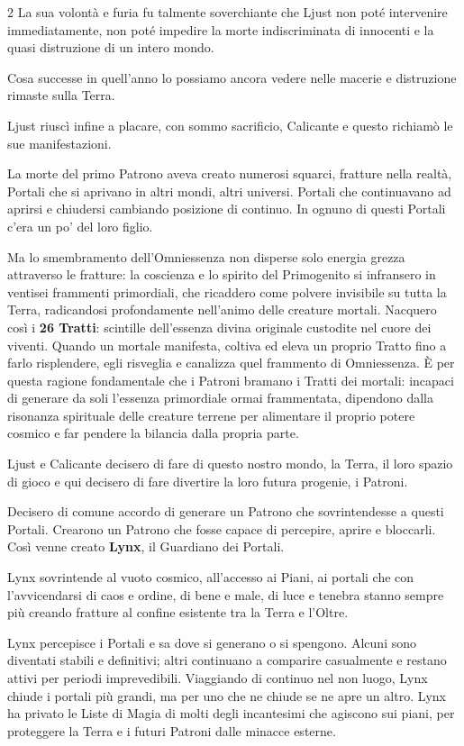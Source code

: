 \begin{multicols}{2}
La sua volontà e furia fu talmente soverchiante che Ljust non poté intervenire immediatamente, non poté impedire la morte indiscriminata di innocenti e la quasi distruzione di un intero mondo.

Cosa successe in quell'anno lo possiamo ancora vedere nelle macerie e distruzione rimaste sulla Terra.

Ljust riuscì infine a placare, con sommo sacrificio, Calicante e questo richiamò le sue manifestazioni.

La morte del primo Patrono aveva creato numerosi squarci, fratture nella realtà, Portali che si aprivano in altri mondi, altri universi. Portali che continuavano ad aprirsi e chiudersi cambiando posizione di continuo. In ognuno di questi Portali c'era un po' del loro figlio.

Ma lo smembramento dell'Omniessenza non disperse solo energia grezza attraverso le fratture: la coscienza e lo spirito del Primogenito si infransero in ventisei frammenti primordiali, che ricaddero come polvere invisibile su tutta la Terra, radicandosi profondamente nell'animo delle creature mortali. Nacquero così i \textbf{26 Tratti}: scintille dell'essenza divina originale custodite nel cuore dei viventi. Quando un mortale manifesta, coltiva ed eleva un proprio Tratto fino a farlo risplendere, egli risveglia e canalizza quel frammento di Omniessenza. È per questa ragione fondamentale che i Patroni bramano i Tratti dei mortali: incapaci di generare da soli l'essenza primordiale ormai frammentata, dipendono dalla risonanza spirituale delle creature terrene per alimentare il proprio potere cosmico e far pendere la bilancia dalla propria parte.

Ljust e Calicante decisero di fare di questo nostro mondo, la Terra, il loro spazio di gioco e qui decisero di fare divertire la loro futura progenie, i Patroni.

Decisero di comune accordo di generare un Patrono che sovrintendesse a questi Portali. Crearono un Patrono che fosse capace di percepire, aprire e bloccarli. Così venne creato \textbf{Lynx}, il Guardiano dei Portali.

Lynx sovrintende al vuoto cosmico, all'accesso ai Piani, ai portali che con l'avvicendarsi di caos e ordine, di bene e male, di luce e tenebra stanno sempre più creando fratture al confine esistente tra la Terra e l'Oltre.

Lynx percepisce i Portali e sa dove si generano o si spengono. Alcuni sono diventati stabili e definitivi; altri continuano a comparire casualmente e restano attivi per periodi imprevedibili. Viaggiando di continuo nel non luogo, Lynx chiude i portali più grandi, ma per uno che ne chiude se ne apre un altro. Lynx ha privato le Liste di Magia di molti degli incantesimi che agiscono sui piani, per proteggere la Terra e i futuri Patroni dalle minacce esterne.


\end{multicols}
